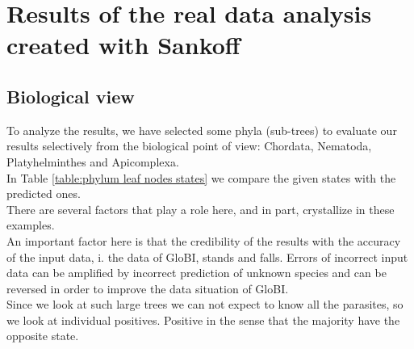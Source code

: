   \section{Results of the real data analysis created with Sankoff}

    \subsection{Biological view}
      To analyze the results, we have selected some phyla (sub-trees) to evaluate our results 
        selectively from the biological point of view: Chordata, Nematoda, Platyhelminthes and 
        Apicomplexa. \\
      In Table \ref{table:phylum leaf nodes states} we compare the given states with the predicted ones. \\
      There are several factors that play a role here, and in part, crystallize in these examples. \\
      An important factor here is that the credibility of the results with the accuracy of the input 
        data, i. the data of GloBI, stands and falls. Errors of incorrect input data can be amplified by 
        incorrect prediction of unknown species and can be reversed in order to improve the data 
        situation of GloBI. \\
      Since we look at such large trees we can not expect to know all the parasites, so we look at 
        individual positives. Positive in the sense that the majority have the opposite state.


